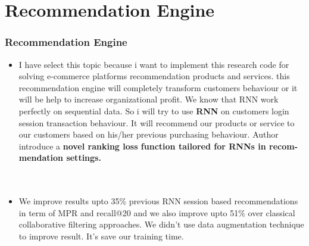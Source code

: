\documentclass{beamer}
\begin{document}
\section{Recommendation Engine}
\begin{frame}
\frametitle{Recommendation Engine}
\begin{minipage}{\textwidth}
	\begin{itemize}
	\\~\\
    \item I have select this topic because i want to implement this research code for solving e-commerce platforms recommendation products and services. this recommendation engine will completely transform customers behaviour or it will be help to increase organizational profit. We know that RNN work perfectly on sequential data. So i will try to use \textbf{RNN} on customers login session transaction behaviour. It will recommend our products or service to our customers based on his/her previous purchasing behaviour. Author introduce a \textbf{novel ranking loss function tailored for RNNs in recom-mendation settings.} \\ \newline \newline
    \\~\\
    \item We improve results upto 35\% previous RNN session based recommendations in term of MPR and recall@20 and we also improve upto 51\% over classical collaborative filtering approaches. We didn’t use data augmentation technique to improve result. It’s save our training time.

    
    \end{itemize}

\end{minipage}
\end{frame}
\end{document}
